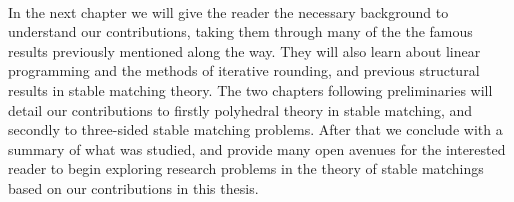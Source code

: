 \paragraph{}
In the next chapter we will give the reader the necessary background to understand our contributions, taking them through many of the the famous results previously mentioned along the way. They will also learn about linear programming and the methods of iterative rounding, and previous structural results in stable matching theory. The two chapters following preliminaries will detail our contributions to firstly polyhedral theory in stable matching, and secondly to three-sided stable matching problems. After that we conclude with a summary of what was studied, and provide many open avenues for the interested reader to begin exploring research problems in the theory of stable matchings based on our contributions in this thesis.
